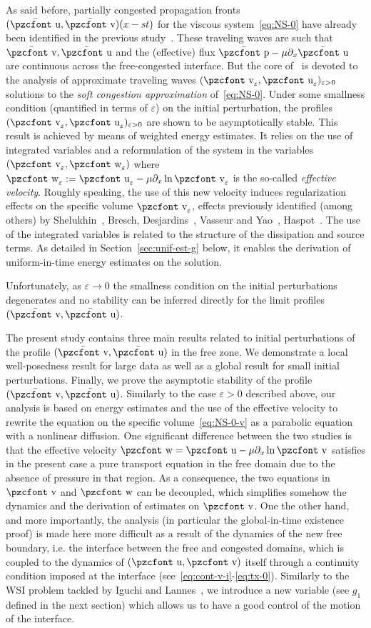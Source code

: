 \documentclass[10pt]{amsart}
\theoremstyle{definition}\newtheorem{defi}[theo]{Definition}\newtheorem{rema}[theo]{Remark}\newtheorem{exam}[theo]{Example}\newtheorem{exem}[theo]{Example}\newtheorem{nota}[theo]{Notation}
\newcommand{\mathpzc}[1]{\text{\pzcfont #1}}
\newcommand{\ep}{\varepsilon}
\newcommand{\p}{\partial}
\newcommand{\bv}{\bar{\mathpzc{v}}}
\newcommand{\bu}{\bar{\mathpzc{u}}}
\newcommand{\bp}{\bar{\mathpzc{p}}}
\newcommand{\tv}{\mathpzc{v}}
\newcommand{\tu}{\mathpzc{u}}
\newcommand{\tw}{\mathpzc{w}}
\begin{document}
As said before, partially congested propagation fronts $(\bu, \bv)(x-st)$ for the viscous system~\eqref{eq:NS-0} have already been identified in the previous study~\cite{DP}. These traveling waves are such that $\bv, \bu$ and the (effective) flux $\bp-\mu\partial_x \bu$ are continuous across the free-congested interface. But the core of~\cite{DP} is devoted to the analysis of approximate traveling waves $(\tv_\ep,\tu_\ep)_{\ep> 0}$ solutions to the \emph{soft congestion approximation} of~\eqref{eq:NS-0}. Under some smallness condition (quantified in terms of $\ep$) on the initial perturbation, the profiles $(\tv_\ep,\tu_\ep)_{\ep> 0}$ are shown to be asymptotically stable. This result is achieved by means of weighted energy estimates. It relies on the use of integrated variables and a reformulation of the system in the variables $(\tv_\ep,\tw_\ep)$ where $\tw_\ep:= \tu_\ep -\mu \partial_x \ln\tv_\ep$ is the so-called \emph{effective velocity}. Roughly speaking, the use of this new velocity induces regularization effects on the specific volume $\tv_\ep$, effects previously identified (among others) by Shelukhin~\cite{shelukhin1984}, Bresch, Desjardins~\cite{bresch2006}, Vasseur and Yao~\cite{vasseur2016}, Haspot~\cite{haspot2018}. The use of the integrated variables is related to the structure of the dissipation and source terms. As detailed in Section~\ref{sec:unif-est-g} below, it enables the derivation of uniform-in-time energy estimates on the solution.


Unfortunately, as $\ep \to 0$ the smallness condition on the initial perturbations degenerates and no stability can be inferred directly for the limit profiles $(\bv,\bu)$.



The present study contains three main results related to initial perturbations of the profile $(\bv,\bu)$ in the free zone. We demonstrate a local well-posedness result for large data as well as a global result for small initial perturbations. Finally, we prove the asymptotic stability of the profile $(\bv,\bu)$. Similarly to the case $\ep > 0$ described above, our analysis is based on energy estimates and the use of the effective velocity to rewrite the equation on the specific volume~\eqref{eq:NS-0-v} as a parabolic equation with a nonlinear diffusion. One significant difference between the two studies is that the effective velocity $\tw=\tu - \mu \p_x \ln \tv$ satisfies in the present case a pure transport equation in the free domain due to the absence of pressure in that region. As a consequence, the two equations in $\tv$ and $\tw$ can be decoupled, which simplifies somehow the dynamics and the derivation of estimates on $\tv$. One the other hand, and more importantly, the analysis (in particular the global-in-time existence proof) is made here more difficult as a result of the dynamics of the new free boundary, i.e. the interface between the free and congested domains, which is coupled to the dynamics of $(\tu, \tv)$ itself through a continuity condition imposed at the interface (see~\eqref{eq:cont-v-i}-\eqref{eq:tx-0}). Similarly to the WSI problem tackled by Iguchi and Lannes~\cite{iguchi2019}, we introduce a new variable (see $g_1$ defined in the next section) which allows us to have a good control of the motion of the interface.
\end{document}
